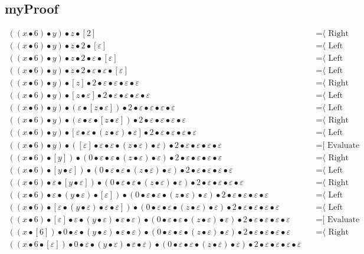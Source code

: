 \documentclass{article}
\begin{document}
\subsection{myProof}
\begin{align*}
((x • 6) • y) • z • [2]
  & \quad \text{=⟨ Right neutrality ]}\\
((x • 6) • y) • z • 2 • [ε]
  & \quad \text{=⟨ Left neutrality ]}\\
((x • 6) • y) • z • 2 • ε • [ε]
  & \quad \text{=⟨ Left neutrality ]}\\
((x • 6) • y) • z • 2 • ε • ε • [ε]
  & \quad \text{=⟨ Left neutrality ]}\\
((x • 6) • y) • [z] • 2 • ε • ε • ε • ε
  & \quad \text{=⟨ Right neutrality ]}\\
((x • 6) • y) • [z • ε] • 2 • ε • ε • ε • ε
  & \quad \text{=⟨ Left neutrality ]}\\
((x • 6) • y) • (ε • [z • ε]) • 2 • ε • ε • ε • ε
  & \quad \text{=⟨ Left neutrality ]}\\
((x • 6) • y) • (ε • ε • [z • ε]) • 2 • ε • ε • ε • ε
  & \quad \text{=⟨ Right neutrality ]}\\
((x • 6) • y) • [ε • ε • (z • ε) • ε] • 2 • ε • ε • ε • ε
  & \quad \text{=⟨ Left neutrality ]}\\
((x • 6) • y) • ([ε] • ε • ε • (z • ε) • ε) • 2 • ε • ε • ε • ε
  & \quad \text{=[ Evaluate ⟩}\\
((x • 6) • [y]) • (0 • ε • ε • (z • ε) • ε) • 2 • ε • ε • ε • ε
  & \quad \text{=⟨ Right neutrality ]}\\
((x • 6) • [y • ε]) • (0 • ε • ε • (z • ε) • ε) • 2 • ε • ε • ε • ε
  & \quad \text{=⟨ Left neutrality ]}\\
((x • 6) • ε • [y • ε]) • (0 • ε • ε • (z • ε) • ε) • 2 • ε • ε • ε • ε
  & \quad \text{=⟨ Right neutrality ]}\\
((x • 6) • ε • (y • ε) • [ε]) • (0 • ε • ε • (z • ε) • ε) • 2 • ε • ε • ε • ε
  & \quad \text{=⟨ Left neutrality ]}\\
((x • 6) • [ε • (y • ε) • ε • ε]) • (0 • ε • ε • (z • ε) • ε) • 2 • ε • ε • ε • ε
  & \quad \text{=⟨ Left neutrality ]}\\
((x • 6) • [ε] • ε • (y • ε) • ε • ε) • (0 • ε • ε • (z • ε) • ε) • 2 • ε • ε • ε • ε
  & \quad \text{=[ Evaluate ⟩}\\
((x • [6]) • 0 • ε • (y • ε) • ε • ε) • (0 • ε • ε • (z • ε) • ε) • 2 • ε • ε • ε • ε
  & \quad \text{=⟨ Right neutrality ]}\\
((x • 6 • [ε]) • 0 • ε • (y • ε) • ε • ε) • (0 • ε • ε • (z • ε) • ε) • 2 • ε • ε • ε • ε

\end{align*}
\end{document}
